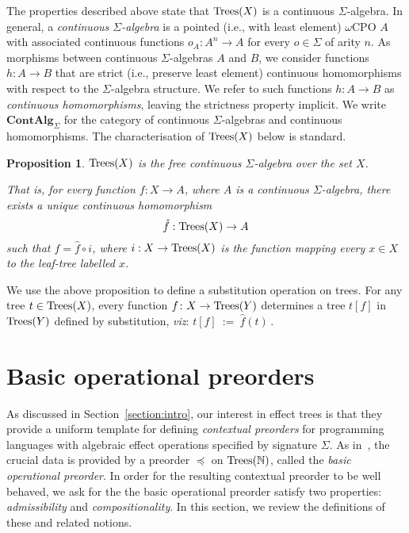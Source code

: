 \documentclass[a4paper,UKenglish]{lipics-v2018}
\newcommand{\Nat}{\mathbb{N}}
\newcommand{\Trees}{\textnormal{Trees}}
\newcommand{\Basicleq}{\preccurlyeq}
\newcommand{\ContAlg}{\mathbf{ContAlg}}
\theoremstyle{plain}
\newtheorem{proposition}[theorem]{Proposition}
\begin{document}
The properties described above state that $\Trees(X)$ is a continuous $\Sigma$-algebra. In general,
a \emph{continuous $\Sigma$-algebra} is a pointed (i.e., with least element) $\omega$CPO $A$ with associated
continuous functions $o_A : A^n \to A$ for every $o \in \Sigma$ of arity $n$. 
As morphisms between continuous $\Sigma$-algebras
$A$ and $B$, we consider functions $h: A \to B$  that are strict (i.e., preserve least element) continuous homomorphisms with respect to the $\Sigma$-algebra structure. 
We refer to such  functions $h: A \to B$ as \emph{continuous homomorphisms}, leaving the strictness property implicit.
We write $\ContAlg_\Sigma$ for the category of continuous $\Sigma$-algebras and continuous homomorphisms.
The characterisation of $\Trees(X)$ below is standard.
\begin{proposition}
\label{proposition:free}
$\Trees(X)$ is the free
    continuous $\Sigma$-algebra over the set $X$.
   \begin{center}
    \end{center}
    That is, for every function $f : X \to A$, where 
    $A$ is a continuous $\Sigma$-algebra,
    there exists a unique continuous homomorphism $$\hat{f} : \Trees(X) \to A$$
    such that $
        f = \hat{f} \circ i $, where $i : X \to \Trees(X)$ is the function mapping every $x \in X$ to the 
        leaf-tree labelled $x$.
 \end{proposition}
 
 We use the above proposition to define a substitution operation on trees. For any tree $t \in \Trees(X)$, 
 every function $f \colon X \to \Trees(Y)$ determines a tree $t[f]$ in $\Trees(Y)$ defined by substitution, \emph{viz}:
 $t[f] ~ := ~ \hat{f}(t)\,$.
 
\section{Basic operational preorders}
\label{section:basic}

As discussed in Section~\ref{section:intro}, our interest in effect trees is that they provide a 
uniform template for defining 
 \emph{contextual preorders} for programming languages with algebraic effect operations
specified by signature $\Sigma$. 
As in~\cite{gom}, the crucial data is provided by a 
preorder  $\Basicleq$  on  $\Trees(\Nat)$, called the \emph{basic operational preorder}.  
In order for the resulting contextual preorder to be well behaved, we ask for the 
the basic operational preorder satisfy two properties: \emph{admissibility} and \emph{compositionality}.
In this section, we review the definitions of these and related notions. 
\end{document}
